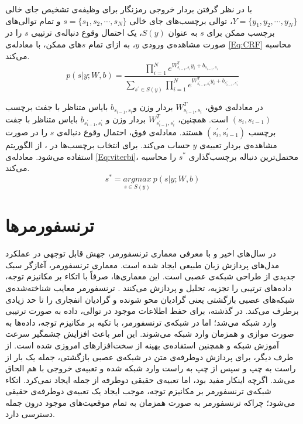 با در نظر گرفتن بردار خروجی رمزنگار برای وظیفه‌ی تشخیص جای خالی $Y=\{y_{1},y_{2},\cdots ,y_{N}\}$، توالی برچسب‌های جای خالی $s=\{s_{1},s_{2},\cdots ,s_{N}\}$ و تمام توالی‌های برچسب ممکن برای $s$ به عنوان $S(y)$، یک  احتمال وقوع دنباله‌ی ترتیبی $s$ را در صورت مشاهده‌ی ورودی $y$، به ازای تمام $s$های ممکن، با معادله‌ی \ref{Eq:CRF} محاسبه می‌کند.
 \begin{equation}
 	p(s|y;W,b)=\frac{\prod_{i=1}^{N}e^{W^{T}_{s_{i-1},s_{i}}y_{i}+b_{s_{i-1},s_{i}}}}{\sum_{s^{\prime}\in S(y)}^{}\prod_{i=1}^{N}e^{W^{T}_{s^{\prime}_{i-1},s^{\prime}_{i}}y_{i}+b_{s^{\prime}_{i-1},s^{\prime}_{i}}}}
 	\label{Eq:CRF}
 \end{equation}

در معادله‌ی فوق، $W^{T}_{s_{i-1},s_{i}}$ بردار وزن و$b_{s_{i-1},s_{i}}$ بایاس متناظر با جفت برچسب $(s_{i},s_{i-1})$ است. همچنین، $W^{T}_{s^{\prime}_{i-1},s^{\prime}_{i}}$ بردار وزن و $b_{s^{\prime}_{i-1},s^{\prime}_{i}}$ بایاس متناظر با جفت برچسب $(s^{\prime}_{i},s^{\prime}_{i-1})$ هستند. معادله‌ی فوق، احتمال وقوع دنباله‌ی $s$ را در صورت مشاهده‌ی بردار تعبیه‌ی $y$ حساب می‌کند. برای انتخاب برچسب‌ها در ، از الگوریتم  استفاده می‌شود. معادله‌ی \ref{Eq:viterbi}،  محتمل‌ترین دنباله برچسب‌گذاری $s^{*}$ را محاسبه می‌کند.
 \begin{equation}
	s^{*}=	\underset{s\in S(y)}{argmax}  \: p(s|y; W,b)
	\label{Eq:viterbi}
\end{equation}

\section{ترنسفورمرها}
در سال‌های اخیر و با معرفی معماری ترنسفورمر، جهش قابل توجهی در عملکرد مدل‌های پردازش زبان طبیعی ایجاد شده است. معماری ترنسفورمر، آغازگر سبک جدیدی از طراحی شبکه‌ی عصبی است. این معماری‌ها، صرفاً با اتکاء بر مکانیزم توجه، داده‌های ترتیبی را تجزیه، تحلیل و پردازش می‌کنند \cite{transformerboom}. ترنسفورمر معایب شناخته‌شده‌ی شبکه‌های عصبی بازگشتی یعنی گرادیان محو شونده و گرادیان انفجاری را تا حد زیادی برطرف می‌کند. در گذشته، برای حفظ اطلاعات موجود در توالی، داده به صورت ترتیبی وارد شبکه می‌شد؛ اما در شبکه‌ی ترنسفورمر، با تکیه بر مکانیزم توجه، داده‌ها به صورت موازی و همزمان وارد شبکه می‌شوند. این امر باعث افزایش چشمگیر سرعت آموزش شبکه و همچنین استفاده‌ی بهینه از سخت‌افزارهای امروزی شده است.
 از طرف دیگر، برای پردازش دوطرفه‌ی متن در شبکه‌ی عصبی بازگشتی، جمله یک بار از راست به چپ و سپس از چپ به راست وارد شبکه شده و تعبیه‌ی خروجی با هم الحاق می‌شد. اگرچه اینکار مفید بود، اما تعبیه‌ی حقیقی دوطرفه از جمله ایجاد نمی‌کرد. اتکاء شبکه‌ی ترنسفورمر بر مکانیزم توجه، موجب ایجاد یک تعبیه‌ی دوطرفه‌ی حقیقی می‌شود؛ چراکه ترنسفورمر به صورت همزمان به تمام موقعیت‌های موجود درون جمله دسترسی دارد.
 

